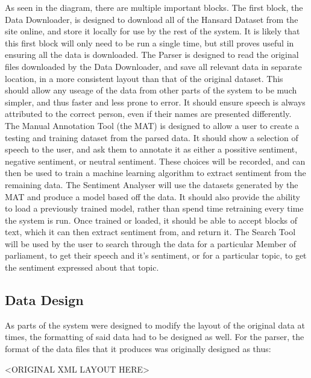 As seen in the diagram, there are multiple important blocks.
The first block, the Data Downloader, is designed to download all of the Hansard Dataset from the site online, and store it locally for use by the rest of the system. It is likely that this first block will only need to be run a single time, but still proves useful in ensuring all the data is downloaded.
The Parser is designed to read the original files downloaded by the Data Downloader, and save all relevant data in separate location, in a more consistent layout than that of the original dataset. This should allow any useage of the data from other parts of the system to be much simpler, and thus faster and less prone to error. It should ensure speech is always attributed to the correct person, even if their names are presented differently.
The Manual Annotation Tool (the MAT) is designed to allow a user to create a testing and training dataset from the parsed data. It should show a selection of speech to the user, and ask them to annotate it as either a possitive sentiment, negative sentiment, or neutral sentiment. These choices will be recorded, and can then be used to train a machine learning algorithm to extract sentiment from the remaining data.
The Sentiment Analyser will use the datasets generated by the MAT and produce a model based off the data. It should also provide the ability to load a previously trained model, rather than spend time retraining every time the system is run. Once trained or loaded, it should be able to accept blocks of text, which it can then extract sentiment from, and return it.
The Search Tool will be used by the user to search through the data for a particular Member of parliament, to get their speech and it’s sentiment, or for a particular topic, to get the sentiment expressed about that topic. 

\subsection{Data Design}
As parts of the system were designed to modify the layout of the original data at times, the formatting of said data had to be designed as well.
For the parser, the format of the data files that it produces was originally designed as thus:

<ORIGINAL XML LAYOUT HERE>


